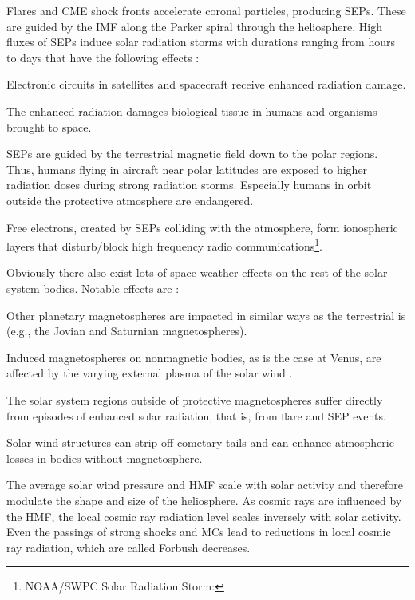 \pagebreak

Flares and CME shock fronts accelerate coronal particles, producing SEPs. These are guided by the IMF along the Parker spiral through the heliosphere. High fluxes of SEPs induce solar radiation storms with durations ranging from hours to days that have the following effects \citep{Bothmer2007}:
\begin{itemize*}
	\item Electronic circuits in satellites and spacecraft receive enhanced radiation damage.
	\item The enhanced radiation damages biological tissue in humans and organisms brought to space.
	\item SEPs are guided by the terrestrial magnetic field down to the polar regions. Thus, humans flying in aircraft near polar latitudes are exposed to higher radiation doses during strong radiation storms. Especially humans in orbit outside the protective atmosphere are endangered.
	\item Free electrons, created by SEPs colliding with the atmosphere, form ionospheric layers that disturb/block high frequency radio communications\footnote{NOAA/SWPC Solar Radiation Storm: }.
\end{itemize*}

Obviously there also exist lots of space weather effects on the rest of the solar system bodies. Notable effects are \citep{Bothmer2007}:
\begin{itemize*}
	\item Other planetary magnetospheres are impacted in similar ways as the terrestrial is (e.g., the Jovian and Saturnian magnetospheres).
	\item Induced magnetospheres on nonmagnetic bodies, as is the case at Venus, are affected by the varying external plasma of the solar wind \citep{Luhmann2004}.
	\item The solar system regions outside of protective magnetospheres suffer directly from episodes of enhanced solar radiation, that is, from flare and SEP events.
	\item Solar wind structures can strip off cometary tails and can enhance atmospheric losses in bodies without magnetosphere.
	\item The average solar wind pressure and HMF scale with solar activity and therefore modulate the shape and size of the heliosphere. As cosmic rays are influenced by the HMF, the local cosmic ray radiation level scales inversely with solar activity. Even the passings of strong shocks and MCs lead to reductions in local cosmic ray radiation, which are called Forbush decreases.
\end{itemize*}

